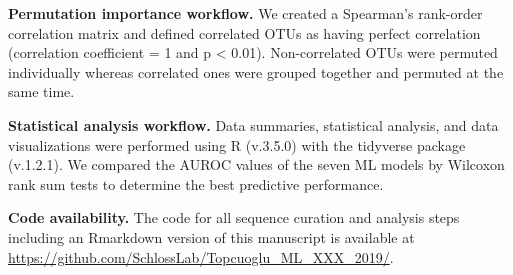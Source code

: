 \documentclass[11pt,]{article}
\begin{document}
\textbf{Permutation importance workflow.} We created a Spearman's
rank-order correlation matrix and defined correlated OTUs as having
perfect correlation (correlation coefficient = 1 and p \textless{}
0.01). Non-correlated OTUs were permuted individually whereas correlated
ones were grouped together and permuted at the same time.

\textbf{Statistical analysis workflow.} Data summaries, statistical
analysis, and data visualizations were performed using R (v.3.5.0) with
the tidyverse package (v.1.2.1). We compared the AUROC values of the
seven ML models by Wilcoxon rank sum tests to determine the best
predictive performance.

\textbf{Code availability.} The code for all sequence curation and
analysis steps including an Rmarkdown version of this manuscript is
available at \url{https://github.com/SchlossLab/Topcuoglu_ML_XXX_2019/}.

\newpage
\end{document}
